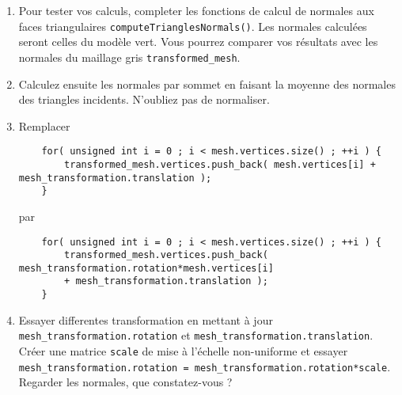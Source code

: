 \documentclass[a4paper,10pt]{article}
\newcommand\code[1]{\lstinline[columns=fixed]{#1}}
\begin{document}
\begin{enumerate}
\item Pour tester vos calculs, completer les fonctions de calcul de normales aux faces triangulaires \code{computeTrianglesNormals()}. Les normales calculées seront celles du modèle vert. Vous pourrez comparer vos résultats avec les normales du maillage gris \code{transformed_mesh}. 
\item Calculez ensuite les normales par sommet en faisant la moyenne des normales des triangles incidents. N'oubliez pas de normaliser.
\item Remplacer 
\begin{lstlisting}
    for( unsigned int i = 0 ; i < mesh.vertices.size() ; ++i ) {
        transformed_mesh.vertices.push_back( mesh.vertices[i] + mesh_transformation.translation );
    }
\end{lstlisting}
par 
\begin{lstlisting}
    for( unsigned int i = 0 ; i < mesh.vertices.size() ; ++i ) {
        transformed_mesh.vertices.push_back( mesh_transformation.rotation*mesh.vertices[i] 
        + mesh_transformation.translation );
    }
\end{lstlisting}

\item Essayer differentes transformation en mettant à jour  \code{mesh_transformation.rotation} et \code{mesh_transformation.translation}. 
Créer une matrice \code{scale} de mise à l'échelle non-uniforme et essayer \code{mesh_transformation.rotation = mesh_transformation.rotation*scale}. Regarder les normales, que constatez-vous ?

\end{enumerate}


\end{document}
